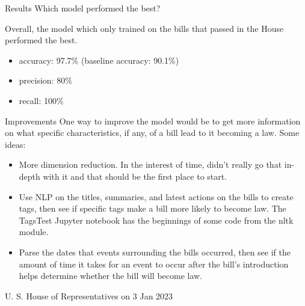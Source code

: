 \documentclass[handout,
	12pt]{beamer}
\begin{document}
\begin{frame}{Results}{}
Which model performed the best?  

\pause
\vspace{1pc}
Overall, the model which only trained on the bills that passed in the House performed the best.

\pause
\begin{itemize}
\item accuracy: 97.7\% \pause (baseline accuracy: 90.1\%)
\pause
\item precision: 80\%
\pause
\item recall: 100\%
\end{itemize}
\end{frame}
	
\begin{frame}{Improvements}{}
One way to improve the model would be to get more information on what specific characteristics, if any, of a bill lead to it becoming a law.  \pause Some ideas:
\pause
{\small
\begin{itemize}
\itemsep0em
\item More dimension reduction.  In the interest of time, didn't really go that in-depth with it and that should be the first place to start.
\pause
\item Use NLP on the titles, summaries, and latest actions on the bills to create tags, then see if specific tags make a bill more likely to become law.  The TagsTest Jupyter notebook has the beginnings of some code from the nltk module.
\pause
\item Parse the dates that events surrounding the bills occurred, then see if the amount of time it takes for an event to occur after the bill's introduction helps determine whether the bill will become law.
\end{itemize}
}
\end{frame}

	
\begin{frame}{}{}
\vspace{17pc}
\begin{flushright}
\hspace{50pt}
{\color{gray}U. S. House of Representatives on 3 Jan 2023}
\end{flushright}
\end{frame}

\end{document}
